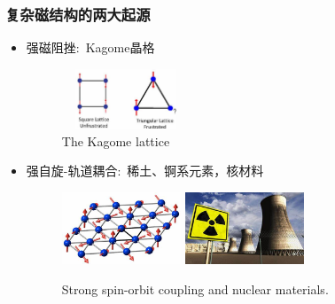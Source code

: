 \documentclass[cjk,slidestop,compress,mathserif,blue]{beamer}
\begin{document}
\frame
{
	\frametitle{复杂磁结构的两大起源}
	\begin{itemize}
		\item 强磁阻挫:~\textrm{Kagome}晶格
\begin{figure}[h!]
\vspace*{-0.08in}
\centering
\includegraphics[height=0.7in,width=1.5in]{Figures/Magnet-Kagome-lattice.png}
\caption{\tiny \textrm{The Kagome lattice}}%
\label{Fig:Magnet-Kamoge}
\end{figure}
		\item 强自旋-轨道耦合:~稀土、锕系元素，核材料
\begin{figure}[h!]
\vspace*{-0.08in}
\centering
\includegraphics[height=0.85in,width=1.4in]{Figures/Magnet-Strong-SOC.png}
\includegraphics[height=0.85in,width=1.4in]{Figures/Nuclear-Power.png}
\caption{\tiny \textrm{Strong spin-orbit coupling and nuclear materials.}}%
\label{Fig:Magnet-SOC}
\end{figure}
	\end{itemize}
}
\end{document}
